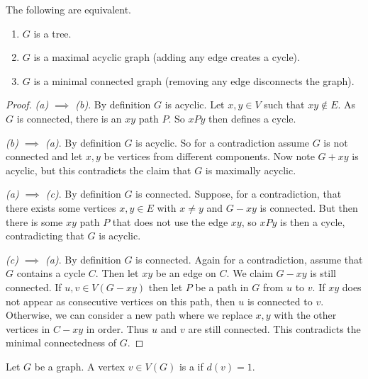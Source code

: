\documentclass[a4paper]{scrartcl}
\begin{document}
\begin{example}
\begin{center}
\begin{tikzpicture}[x=0.75pt,y=0.75pt,yscale=-1,xscale=1]
\end{tikzpicture}

	\end{center}
\end{example}



\begin{proposition}
	The following are equivalent.
	\begin{enumerate}[label=(\alph*)]
		\item $G$ is a tree.
		\item $G$ is a maximal acyclic graph (adding any edge creates a cycle).
		\item $G$ is a minimal connected graph (removing any edge disconnects the graph).
	\end{enumerate}
\end{proposition}
\begin{proof}
	\emph{(a) $\implies$ (b)}. By definition $G$ is acyclic. Let $x, y \in V$ such that $xy \not \in E$. As $G$ is connected, there is an $xy$ path $P$. So $xPy$ then defines a cycle.

	\emph{(b) $\implies$ (a)}. By definition $G$ is acyclic. 
	So for a contradiction assume $G$ is not connected and let $x, y$ be vertices from different components. Now note $G + xy$ is acyclic, but this contradicts the claim that $G$ is maximally acyclic.

	\emph{(a) $\implies$ (c)}. By definition $G$ is connected. Suppose, for a contradiction, that there exists some vertices $x, y \in E$ with $x \neq y$ and $G - xy$ is connected. But then there is some $xy$ path $P$ that does not use the edge $xy$, so $xPy$ is then a cycle, contradicting that $G$ is acyclic.

	\emph{(c) $\implies$ (a)}. By definition $G$ is connected. Again for a contradiction, assume that $G$ contains a cycle $C$. Then let $xy$ be an edge on $C$. We claim $G - xy$ is still connected. If $u, v \in V(G - xy)$ then let $P$ be a path in $G$ from $u$ to $v$. If $xy$ does not appear as consecutive vertices on this path, then $u$ is connected to $v$. Otherwise, we can consider a new path where we replace $x,y$ with the other vertices in $C - xy$ in order. Thus $u$ and $v$ are still connected. This contradicts the minimal connectedness of $G$. 

\end{proof}

\begin{definition}[Leaf]
	Let $G$ be a graph. A vertex $v \in V(G)$ is a  if $d(v) = 1$.
\end{definition}
\end{document}
